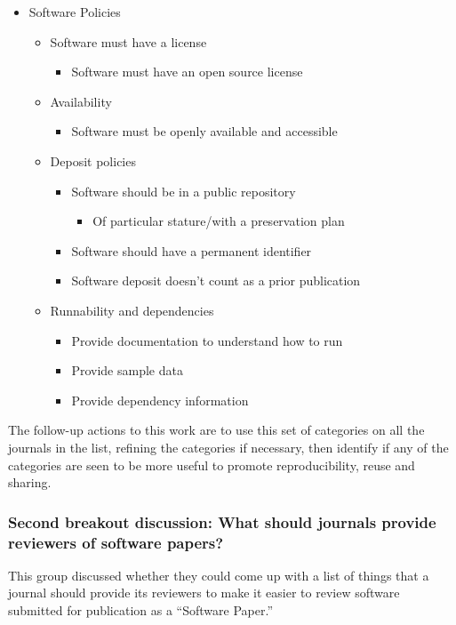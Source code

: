 \documentclass[11pt, oneside]{amsart}
\begin{document}
\begin{itemize}
\item Software Policies
\begin{itemize}
	\item Software must have a license
	\begin{itemize}
		\item Software must have an open source license
	\end{itemize}
	\item Availability
	\begin{itemize}
		\item Software must be openly available and accessible
	\end{itemize}
	\item Deposit policies
	\begin{itemize}
		\item Software should be in a public repository
		\begin{itemize}
			\item Of particular stature/with a preservation plan
		\end{itemize}
		\item Software should have a permanent identifier
		\item Software deposit doesn't count as a prior publication
	\end{itemize}
	\item Runnability and dependencies
	\begin{itemize}
		\item Provide documentation to understand how to run
		\item Provide sample data
		\item Provide dependency information
	\end{itemize}
\end{itemize}
\end{itemize}

The follow-up actions to this work are to use this set of categories on all the
journals in the list, refining the categories if necessary, then identify if any
of the categories are seen to be more useful to promote reproducibility, reuse
and sharing.

\subsubsection{Second breakout discussion: What should journals provide reviewers of software papers?}

This group discussed whether they could come up with a list of things that a
journal should provide its reviewers to make it easier to review software
submitted for publication as a ``Software Paper.''
\end{document}
